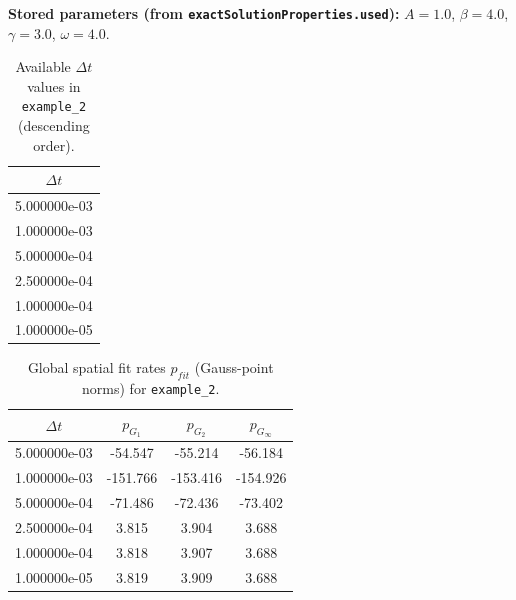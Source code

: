 \documentclass[11pt,a4paper]{article}
\begin{document}
\textbf{Stored parameters (from \texttt{exactSolutionProperties.used}):} $A=1.0$, $\beta=4.0$, $\gamma=3.0$, $\omega=4.0$.
\begin{table}[htbp]
\centering
\small
\caption{Available $\Delta t$ values in \texttt{example\_2} (descending order).}
\begin{tabular}{c}
\toprule
$\Delta t$ \\
\midrule
5.000000e-03 \\
1.000000e-03 \\
5.000000e-04 \\
2.500000e-04 \\
1.000000e-04 \\
1.000000e-05 \\
\bottomrule
\end{tabular}
\end{table}
\begin{table}[htbp]
\centering
\scriptsize
\caption{Global spatial fit rates $p_{fit}$ (cell-centered norms) for \texttt{example\_2}.}
\end{table}
\begin{table}[htbp]
\centering
\scriptsize
\caption{Global spatial fit rates $p_{fit}$ (Gauss-point norms) for \texttt{example\_2}.}
\begin{tabular}{cccc}
\toprule
$\Delta t$ & $p_{G_1}$ & $p_{G_2}$ & $p_{G_\infty}$ \\
\midrule
5.000000e-03 & -54.547 & -55.214 & -56.184 \\
1.000000e-03 & -151.766 & -153.416 & -154.926 \\
5.000000e-04 & -71.486 & -72.436 & -73.402 \\
2.500000e-04 & 3.815 & 3.904 & 3.688 \\
1.000000e-04 & 3.818 & 3.907 & 3.688 \\
1.000000e-05 & 3.819 & 3.909 & 3.688 \\
\bottomrule
\end{tabular}
\end{table}
\end{document}
